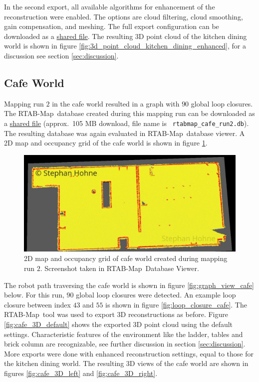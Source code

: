 \documentclass[10pt, journal, compsoc]{IEEEtran}
\newcommand{\rtab}{RTAB-Map}
\begin{document}
In the second export, all available algorithms for enhancement of the reconstruction were enabled. The options are cloud filtering, cloud smoothing, gain compensation, and meshing. The full export configuration can be downloaded as a \href{https://drive.google.com/open?id=1bmjYFEaccEG5NGRl02-8-JeOp9Mh6Myq}{shared file}. The resulting 3D point cloud of the kitchen dining world is shown in figure \ref{fig:3d_point_cloud_kitchen_dining_enhanced}, for a discussion see section \ref{sec:discussion}.

\subsection{Cafe World}
Mapping run $2$ in the cafe world resulted in a graph with $90$ global loop closures. The \rtab\ database created during this mapping run can be downloaded as a \href{https://drive.google.com/file/d/1fHX3h5c7w3LujcECYeHjkJM_bD-jZVOq/view?usp=sharing}{shared file} (approx.\ 105 MB download, file name is \texttt{
rtabmap\_cafe\_run2.db}). The resulting database was again evaluated in \rtab\ database  viewer. A 2D map and occupancy grid of the cafe world is shown in figure \ref{fig:rtabmap_occupancy_grid_cafe}.
\begin{figure}[htbp]
      \centering
      \includegraphics[width=\columnwidth]{images/rtabmap_occupancy_grid_cafe.jpg}
      \caption{2D map and occupancy grid of cafe world created during mapping run $2$. Screenshot taken in \rtab\ Database Viewer.}
      \label{fig:rtabmap_occupancy_grid_cafe}
\end{figure}

The robot path traversing the cafe world is shown in figure \ref{fig:graph_view_cafe} below. For this run, $90$ global loop closures were detected. An example loop closure between index $43$ and $55$ is shown in figure \ref{fig:loop_closure_cafe}. The \rtab\ tool was used to export 3D reconstructions as before. Figure \ref{fig:cafe_3D_default} shows the exported 3D point cloud using the default settings. Characteristic features of the environment like the ladder, tables and brick column are recognizable, see further discussion in section \ref{sec:discussion}. More exports were done with enhanced reconstruction settings, equal to those for the kitchen dining world. The resulting 3D views of the cafe world are shown in figures \ref{fig:cafe_3D_left} and \ref{fig:cafe_3D_right}.
\end{document}
